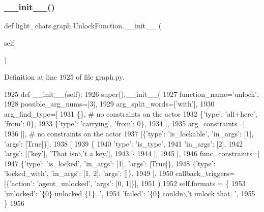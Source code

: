 \subsubsection{\texorpdfstring{\+\_\+\+\_\+init\+\_\+\+\_\+()}{\_\_init\_\_()}}
{\footnotesize\ttfamily def light\+\_\+chats.\+graph.\+Unlock\+Function.\+\_\+\+\_\+init\+\_\+\+\_\+ (\begin{DoxyParamCaption}\item[{}]{self }\end{DoxyParamCaption})}



Definition at line 1925 of file graph.\+py.


\begin{DoxyCode}
1925     \textcolor{keyword}{def }\_\_init\_\_(self):
1926         super().\_\_init\_\_(
1927             function\_name=\textcolor{stringliteral}{'unlock'},
1928             possible\_arg\_nums=[3],
1929             arg\_split\_words=[\textcolor{stringliteral}{'with'}],
1930             arg\_find\_type=[
1931                 \{\},  \textcolor{comment}{# no constraints on the actor}
1932                 \{\textcolor{stringliteral}{'type'}: \textcolor{stringliteral}{'all+here'}, \textcolor{stringliteral}{'from'}: 0\},
1933                 \{\textcolor{stringliteral}{'type'}: \textcolor{stringliteral}{'carrying'}, \textcolor{stringliteral}{'from'}: 0\},
1934             ],
1935             arg\_constraints=[
1936                 [],  \textcolor{comment}{# no constraints on the actor}
1937                 [\{\textcolor{stringliteral}{'type'}: \textcolor{stringliteral}{'is\_lockable'}, \textcolor{stringliteral}{'in\_args'}: [1], \textcolor{stringliteral}{'args'}: [\textcolor{keyword}{True}]\}],
1938                 [
1939                     \{
1940                         \textcolor{stringliteral}{'type'}: \textcolor{stringliteral}{'is\_type'},
1941                         \textcolor{stringliteral}{'in\_args'}: [2],
1942                         \textcolor{stringliteral}{'args'}: [[\textcolor{stringliteral}{'key'}], \textcolor{stringliteral}{'That isn\(\backslash\)'t a key.'}],
1943                     \}
1944                 ],
1945             ],
1946             func\_constraints=[
1947                 \{\textcolor{stringliteral}{'type'}: \textcolor{stringliteral}{'is\_locked'}, \textcolor{stringliteral}{'in\_args'}: [1], \textcolor{stringliteral}{'args'}: [\textcolor{keyword}{True}]\},
1948                 \{\textcolor{stringliteral}{'type'}: \textcolor{stringliteral}{'locked\_with'}, \textcolor{stringliteral}{'in\_args'}: [1, 2], \textcolor{stringliteral}{'args'}: []\},
1949             ],
1950             callback\_triggers=[\{\textcolor{stringliteral}{'action'}: \textcolor{stringliteral}{'agent\_unlocked'}, \textcolor{stringliteral}{'args'}: [0, 1]\}],
1951         )
1952         self.formats = \{
1953             \textcolor{stringliteral}{'unlocked'}: \textcolor{stringliteral}{'\{0\} unlocked \{1\}. '},
1954             \textcolor{stringliteral}{'failed'}: \textcolor{stringliteral}{'\{0\} couldn\(\backslash\)'t unlock that. '},
1955         \}
1956 
\end{DoxyCode}


